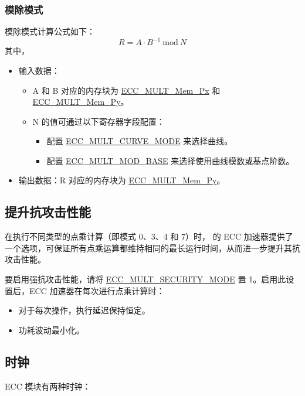 \documentclass[main\_\_CN.tex]{subfiles}
\begin{document}
\subsubsection{模除模式}
模除模式计算公式如下：
\[
R = A \cdot {B}^{-1} \ \textrm{mod}\ N
\]
其中，
\begin{itemize}
    \item 输入数据：
    \begin{itemize}
        \item A 和 B 对应的内存块为 \hyperref[tab:ecc-memory]{ECC\_MULT\_Mem\_Px} 和 \hyperref[tab:ecc-memory]{ECC\_MULT\_Mem\_Py}。
        \item N 的值可通过以下寄存器字段配置：
        \begin{itemize}
            \item 配置 \hyperref[fielddesc:ECCMULTCURVEMODE]{ECC\_MULT\_CURVE\_MODE} 来选择曲线。
            \item 配置 \hyperref[fielddesc:ECCMULTMODBASE]{ECC\_MULT\_MOD\_BASE} 来选择使用曲线模数或基点阶数。
        \end{itemize}
    \end{itemize}
    \item 输出数据：R 对应的内存块为 \hyperref[tab:ecc-memory]{ECC\_MULT\_Mem\_Py}。
\end{itemize}


\subsection{提升抗攻击性能}
\label{sec:ecc-anti-attack}

在执行不同类型的点乘计算（即模式 0、3、4 和 7）时，\chipname{} 的 ECC 加速器提供了一个选项，可保证所有点乘运算都维持相同的最长运行时间，从而进一步提升其抗攻击性能。

要启用强抗攻击性能，请将 \hyperref[fielddesc:ECCMULTSECURITYMODE]{ECC\_MULT\_SECURITY\_MODE} 置 1。启用此设置后，ECC 加速器在每次进行点乘计算时：

\begin{itemize}
    \item 对于每次操作，执行延迟保持恒定。
    \item 功耗波动最小化。
\end{itemize}


\subsection{时钟}
\label{sec:ecc-clk}

\chipname{} ECC 模块有两种时钟：
\end{document}
